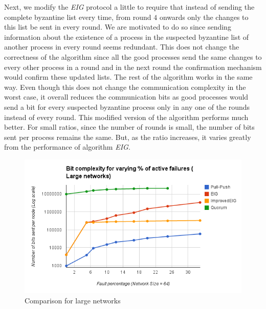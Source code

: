         Next, we modify the \textit{EIG} protocol a little to require that
        instead of sending the complete byzantine list every time, from round
        $4$ onwards only the changes to this list be sent in every round. We
        are motivated to do so since sending information about the existence of
        a process in the suspected byzantine list of another process in every
        round seems redundant. This does not change the correctness of the
        algorithm since all the good processes send the same changes to every
        other process in a round and in the next round the confirmation
        mechanism would confirm these updated lists. The rest of the algorithm
        works in the same way. Even though this does not change the
        communication complexity in the worst case, it overall reduces the
        communication bits as good processes would send a bit for every
        suspected byzantine process only in any one of the rounds instead of
        every round. This modified version of the algorithm performs much
        better. For small ratios, since the number of rounds is small, the
        number of bits sent per process remains the same. But, as the ratio
        increases, it varies greatly from the performance of algorithm
        \textit{EIG}.  \begin{figure}[ht] \centering 
            \includegraphics[scale=0.4]{LargeNetBit} 
            \caption{Comparison for large networks} \label{fig:comp}
             \end{figure}


